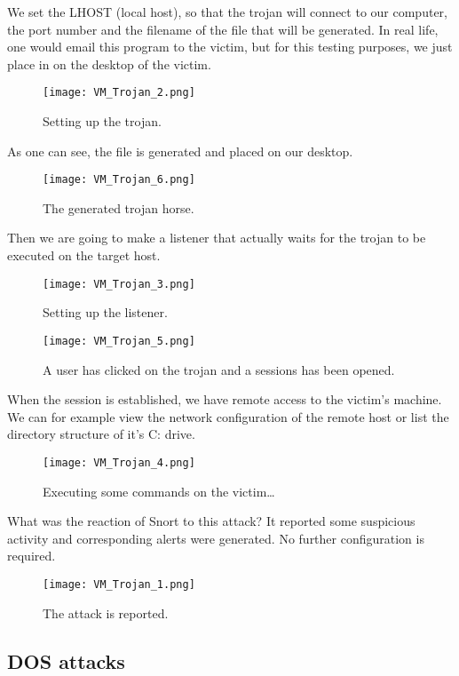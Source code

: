 We set the LHOST (local host), so that the trojan will connect to our computer, the port number and the filename of the file that will be generated. In real life, one would email this program to the victim, but for this testing purposes, we just place in on the desktop of the victim. 

\begin{figure}[h]
    \centering
    \texttt{[image: VM\_Trojan\_2.png]}
    \caption{Setting up the trojan.}
\end{figure}
As one can see, the file is generated and placed on our desktop.
\begin{figure}[h]
    \centering
    \texttt{[image: VM\_Trojan\_6.png]}
    \caption{The generated trojan horse.}
\end{figure}
Then we are going to make a listener that actually waits for the trojan to be executed on the target host. 
\begin{figure}[h]
    \centering
    \texttt{[image: VM\_Trojan\_3.png]}
    \caption{Setting up the listener.}
\end{figure}

\begin{figure}[h]
    \centering
    \texttt{[image: VM\_Trojan\_5.png]}
    \caption{A user has clicked on the trojan and a sessions has been opened.}
\end{figure}

\clearpage

When the session is established, we have remote access to the victim's machine. We can for example view the network configuration of the remote host or list the directory structure of it's C: drive.
\begin{figure}[h]
    \centering
    \texttt{[image: VM\_Trojan\_4.png]}
    \caption{Executing some commands on the victim\ldots}
\end{figure}
What was the reaction of Snort to this attack? It reported some suspicious activity and corresponding alerts were generated. No further configuration is required.
\begin{figure}[h]
    \centering
    \texttt{[image: VM\_Trojan\_1.png]}
    \caption{The attack is reported.}
\end{figure}

\clearpage

\subsection{DOS attacks}

